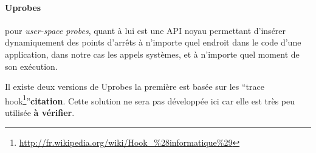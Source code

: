 \paragraph{Uprobes}\citep{AS:Interception, MARION:Interception}



pour \textit{user-space probes}, quant à lui est une API noyau permettant
d'insérer dynamiquement des points d'arrêts à n'importe quel endroit dans le
code d'une application, dans notre cas les appels systèmes, et à n'importe quel
moment de son exécution.

Il existe deux versions de Uprobes la première est basée sur les ``trace
hook\footnote{\url{http://fr.wikipedia.org/wiki/Hook\_\%28informatique\%29}}''\textbf{{\color{red}citation}}. Cette
solution ne sera pas développée ici car elle est très peu utilisée
\textbf{{\color{red} à vérifier}}.

